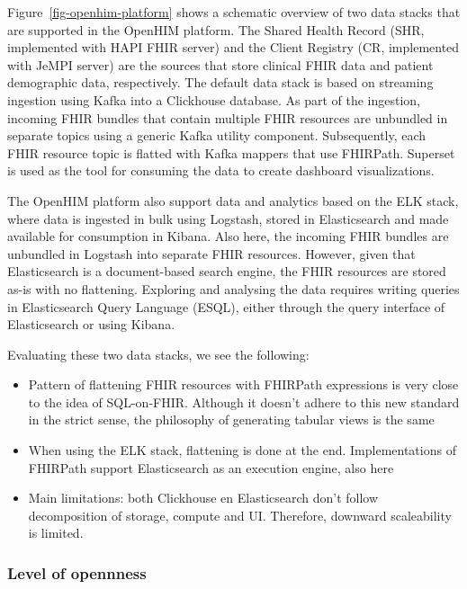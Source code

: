 \documentclass[
  authoryear]{elsarticle}
\providecommand{\tightlist}{%
  \setlength{\itemsep}{0pt}\setlength{\parskip}{0pt}}\usepackage{longtable,booktabs,array}
\begin{document}
Figure~\ref{fig-openhim-platform} shows a schematic overview of two data
stacks that are supported in the OpenHIM platform. The Shared Health
Record (SHR, implemented with HAPI FHIR server) and the Client Registry
(CR, implemented with JeMPI server) are the sources that store clinical
FHIR data and patient demographic data, respectively. The default data
stack is based on streaming ingestion using Kafka into a Clickhouse
database. As part of the ingestion, incoming FHIR bundles that contain
multiple FHIR resources are unbundled in separate topics using a generic
Kafka utility component. Subsequently, each FHIR resource topic is
flatted with Kafka mappers that use FHIRPath. Superset is used as the
tool for consuming the data to create dashboard visualizations.

The OpenHIM platform also support data and analytics based on the ELK
stack, where data is ingested in bulk using Logstash, stored in
Elasticsearch and made available for consumption in Kibana. Also here,
the incoming FHIR bundles are unbundled in Logstash into separate FHIR
resources. However, given that Elasticsearch is a document-based search
engine, the FHIR resources are stored as-is with no flattening.
Exploring and analysing the data requires writing queries in
Elasticsearch Query Language (ES\textbar QL), either through the query
interface of Elasticsearch or using Kibana.

Evaluating these two data stacks, we see the following:

\begin{itemize}
\tightlist
\item
  Pattern of flattening FHIR resources with FHIRPath expressions is very
  close to the idea of SQL-on-FHIR. Although it doesn't adhere to this
  new standard in the strict sense, the philosophy of generating tabular
  views is the same
\item
  When using the ELK stack, flattening is done at the end.
  Implementations of FHIRPath support Elasticsearch as an execution
  engine, also here
\item
  Main limitations: both Clickhouse en Elasticsearch don't follow
  decomposition of storage, compute and UI. Therefore, downward
  scaleability is limited.
\end{itemize}

\subsubsection{Level of opennness}\label{level-of-opennness}
\end{document}
